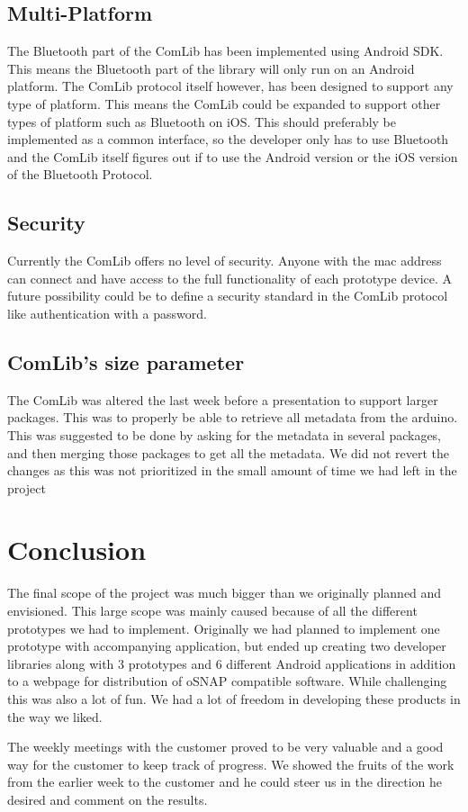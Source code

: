 \subsection{Multi-Platform}
The Bluetooth part of the ComLib has been implemented using Android SDK. This means 
the Bluetooth part of the library will only run on an Android platform. The ComLib protocol
itself however, has been designed to support any type of platform. This means the ComLib
could be expanded to support other types of platform such as Bluetooth on iOS. This
should preferably be implemented as a common interface, so the developer only has to use
Bluetooth and the ComLib itself figures out if to use the Android version or the iOS version of
the Bluetooth Protocol.

\subsection{Security}
Currently the ComLib offers no level of security. Anyone with the mac address can connect
and have access to the full functionality of each prototype device. A future possibility could
be to define a security standard in the ComLib protocol like authentication with a password.

\subsection{ComLib's size parameter}
The ComLib was altered the last week before a presentation to support larger packages. This was to properly
be able to retrieve all metadata from the arduino. This was suggested to be done by asking for the metadata
in several packages, and then merging those packages to get all the metadata. We did not revert the changes
as this was not prioritized in the small amount of time we had left in the project

\section{Conclusion}
The final scope of the project was much bigger than we originally planned and envisioned. This large scope
was mainly caused because of all the different prototypes we had to implement. Originally we had planned
to implement one prototype with accompanying application, but ended up creating two developer libraries
along with 3 prototypes and 6 different Android applications in addition to a webpage for distribution of oSNAP
compatible software. While challenging this was also a lot of fun. We had a lot of freedom in developing
these products in the way we liked.

The weekly meetings with the customer proved to be very valuable and
a good way for the customer to keep track of progress. We showed the fruits of the work from the earlier
week to the customer and he could steer us in the direction he desired and comment on the results.